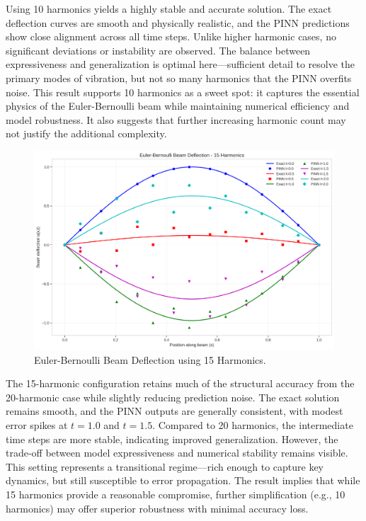 \documentclass[preprint,12pt]{elsarticle}
\begin{document}
Using 10 harmonics yields a highly stable and accurate solution. The exact deflection curves are smooth and physically realistic, and the PINN predictions show close alignment across all time steps. Unlike higher harmonic cases, no significant deviations or instability are observed. The balance between expressiveness and generalization is optimal here—sufficient detail to resolve the primary modes of vibration, but not so many harmonics that the PINN overfits noise. This result supports 10 harmonics as a sweet spot: it captures the essential physics of the Euler-Bernoulli beam while maintaining numerical efficiency and model robustness. It also suggests that further increasing harmonic count may not justify the additional complexity.

\begin{figure}[t]
    \centering
    \includegraphics[width=0.9\linewidth]{figures/euler_bernoulli_beam_15h.png}
    \caption{Euler-Bernoulli Beam Deflection using 15 Harmonics.}
    \label{fig:beam_deflection_15h}
\end{figure}

The 15-harmonic configuration retains much of the structural accuracy from the 20-harmonic case while slightly reducing prediction noise. The exact solution remains smooth, and the PINN outputs are generally consistent, with modest error spikes at $t=1.0$ and $t=1.5$. Compared to 20 harmonics, the intermediate time steps are more stable, indicating improved generalization. However, the trade-off between model expressiveness and numerical stability remains visible. This setting represents a transitional regime—rich enough to capture key dynamics, but still susceptible to error propagation. The result implies that while 15 harmonics provide a reasonable compromise, further simplification (e.g., 10 harmonics) may offer superior robustness with minimal accuracy loss.
\end{document}
